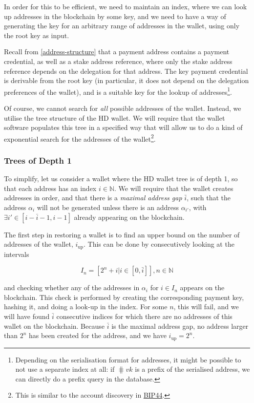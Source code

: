 \documentclass[11pt,a4paper,dvipsnames,twosided]{article}
\begin{document}
In order for this to be efficient, we need to maintain an index, where
we can look up addresses in the blockchain by some key, and we need to
have a way of generating the key for an arbitrary range of addresses in
the wallet, using only the root key as input.

Recall from \cref{address-structure} that a payment address contains a payment
credential, as well as a stake address reference, where only the stake address
reference depends on the delegation for that address. The key payment
credential is derivable from the root key (in
particular, it does not depend on the delegation preferences of the
wallet), and is a suitable key for the lookup of addresses\footnote{Depending
  on the serialisation format for addresses, it might be possible to not
  use a separate index at all: if \(\hash{vk}\) is a prefix of
  the serialised address, we can directly do a prefix query in the
  database.}.

Of course, we cannot search for \emph{all} possible addresses of the
wallet. Instead, we utilise the tree structure of the HD wallet. We will
require that the wallet software populates this tree in a specified way
that will allow us to do a kind of exponential search for the addresses
of the wallet\footnote{This is similar to the account discovery
  in \href{https://github.com/bitcoin/bips/blob/master/bip-0044.mediawiki}{BIP44}.}.

\subsubsection{Trees of Depth 1}
\label{trees-of-depth-1}

To simplify, let us consider a wallet where the HD wallet tree is of
depth 1, so that each address has an index \(i \in \mathbb{N}\). We will
require that the wallet creates addresses in order, and that there is a
\emph{maximal address gap} \(\bar{i}\), such that the address
\(\alpha_i\) will not be generated unless there is an address
\(\alpha_{i'}\), with \(\exists i' \in [i-\bar{i}-1, i-1]\) already
appearing on the blockchain.

The first step in restoring a wallet is to find an upper bound on the
number of addresses of the wallet, \(i_{\text{up}}\). This can be done
by consecutively looking at the intervals

\[
I_{n} = [2^n + i | i \in [0, \bar{i}]], n \in \mathbb{N}
\]

and checking whether any of the addresses in \(\alpha_i\) for
\(i \in I_{n}\) appears on the blockchain. This check is performed by
creating the corresponding payment key, hashing it, and doing a look-up
in the index. For some \(n\), this will fail, and we will have found
\(\bar{i}\) consecutive indices for which there are no addresses of this
wallet on the blockchain. Because \(\bar{i}\) is the maximal address
gap, no address larger than \(2^n\) has been created for the address,
and we have \(i_\text{up} = 2^n\).
\end{document}
